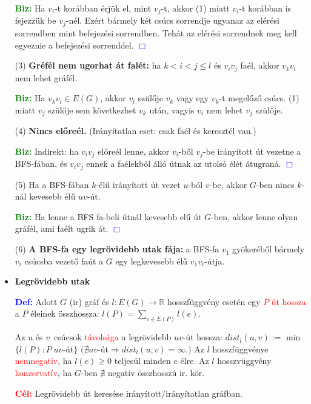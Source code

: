 \documentclass[../../szobeli.tex]{subfiles}
\begin{document}
\begin{itemize}
        \textbf{\textcolor{green}{Biz:}} Ha $v_i$-t korábban érjük el, mint $v_j$-t, akkor (1) miatt $v_i$-t korábban is fejezzük be $v_j$-nél. Ezért bármely két csúcs sorrendje ugyanaz az elérési sorrendben mint befejezési sorrendben. Tehát az elérési sorrendnek meg kell egyeznie a befejezési sorrenddel.  \textcolor{blue}{$\Box$} 

        (3) \textbf{Gréfél nem ugorhat át falét:} ha $k < i < j \leq l$ és  $v_i v_j$ faél, akkor $v_k v_l$ nem lehet gráfél.

        \textbf{\textcolor{green}{Biz:}} Ha $v_k v_l \in E(G)$, akkor $v_l$ szülője $v_k$ vagy egy $v_k$-t megelőző csúcs. (1) miatt $v_j$ szülője sem következhet $v_k$ után, vagyis $v_i$ nem lehet $v_j$ szülője.

        (4) \textbf{Nincs előreél.} (Irányítatlan eset: csak faél és keresztél van.) 

        \textbf{\textcolor{green}{Biz:}} Indirekt: ha $v_i v_j$ előreél lenne, akkor $v_i$-ből $v_j$-be irányított út vezetne a BFS-fában, és $v_i v_j$ ennek a faélekből álló útnak az utolsó élét átugraná.  \textcolor{blue}{$\Box$} 

        (5) Ha a BFS-fában $k$-élű irányított út vezet $u$-ból $v$-be, akkor $G$-ben nincs $k$-nál kevesebb élű $uv$-út.

        \textbf{\textcolor{green}{Biz:}} Ha lenne a BFS fa-beli útnál kevesebb elű út $G$-ben, akkor lenne olyan gráfél, ami faélt ugrik át.  \textcolor{blue}{$\Box$} 

        (6) \textbf{A BFS-fa egy legrövidebb utak fája:} a BFS-fa $v_1$ gyökeréből bármely $v_i$ csúcsba vezető faút a $G$ egy legkevesebb élű $v_1 v_i$-útja.

        \item \textbf{Legrövidebb utak}
				
        \textbf{\textcolor{blue}{Def:}} Adott $G$ (ir) gráf és $l : E(G) \rightarrow \mathbb{R}$ hosszfüggvény esetén egy \textcolor{red}{$P$ út hossza} a $P$ éleinek összhossza: $l(P) = \sum_{e\in E(P)} l(e)$.

        Az $u$ és $v$ csúcsok \textcolor{red}{távolsága} a legrövidebb $uv$-út hossza: $dist_l(u,v):=$ min$\{l(P):P \;uv$-út$\}$ $(\nexists uv$-út$\Rightarrow dist_l (u,v)= \infty.)$ Az $l$  hosszfüggvénye \textcolor{red}{nemnegatív}, ha $l(e) \geq 0$ teljesül minden $e$ élre. Az $l$ hosszvüggvény \textcolor{red}{konzervatív}, ha $G$-ben $\nexists$ negatív összhosszú ir. kör.

        \textbf{\textcolor{red}{Cél:}} Legrövidebb út keresése irányított/irányítatlan gráfban.


\end{itemize}
\end{document}
